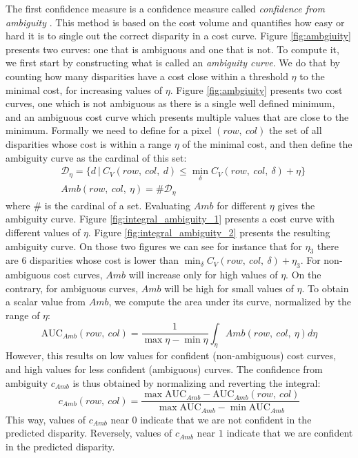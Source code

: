 The first confidence measure is a confidence measure called \textit{confidence from ambiguity} \cite{sarrazin_ambiguity_2021}. This method is based on the cost volume and quantifies how easy or hard it is to single out the correct disparity in a cost curve. Figure \ref{fig:ambgiuity} presents two curves: one that is ambiguous and one that is not. To compute it, we first start by constructing what is called an \textit{ambiguity curve}. We do that by counting how many disparities have a cost close within a threshold $\eta$ to the minimal cost, for increasing values of $\eta$. Figure \ref{fig:ambgiuity} presents two cost curves, one which is not ambiguous as there is a single well defined minimum, and an ambiguous cost curve which presents multiple values that are close to the minimum. Formally we need to define for a pixel $(row, ~col)$ the set of all disparities whose cost is within a range $\eta$ of the minimal cost, and then define the ambiguity curve as the cardinal of this set:
\begin{align}
    &\mathcal{D}_\eta = \{d ~|~ C_V(row,~col,~d) \leqslant \min_\delta C_V(row, ~col, ~\delta) + \eta\}\\
    &Amb(row, ~col, ~\eta) = \#\mathcal{D}_\eta
\end{align}
where $\#$ is the cardinal of a set. Evaluating $Amb$ for different $\eta$ gives the ambiguity curve. Figure \ref{fig:integral_ambiguity_1} presents a cost curve with different values of $\eta$. Figure \ref{fig:integral_ambiguity_2} presents the resulting ambiguity curve. On those two figures we can see for instance that for $\eta_3$ there are $6$ disparities whose cost is lower than $\min_\delta C_V(row, ~col, ~\delta) + \eta_3$. For non-ambiguous cost curves, $Amb$ will increase only for high values of $\eta$. On the contrary, for ambiguous curves, $Amb$ will be high for small values of $\eta$. To obtain a scalar value from $Amb$, we compute the area under its curve, normalized by the range of $\eta$:
\begin{equation}
    \mathrm{AUC}_{Amb}(row, ~col) = \frac{1}{\max\eta-\min\eta}\int_\eta Amb(row,~col,~\eta)d\eta
\end{equation}
However, this results on low values for confident (non-ambiguous) cost curves, and high values for less confident (ambiguous) curves. The confidence from ambiguity $c_{Amb}$ is thus obtained by normalizing and reverting the integral:
\begin{equation}\label{eq:confidence_from_ambiguity}
    c_{Amb}(row, ~col) = \frac{\max \mathrm{AUC}_{Amb}- \mathrm{AUC}_{Amb}(row, ~col)}{\max \mathrm{AUC}_{Amb} -\min \mathrm{AUC}_{Amb}}
\end{equation}
This way, values of $c_{Amb}$ near $0$ indicate that we are not confident in the predicted disparity. Reversely, values of $c_{Amb}$ near $1$ indicate that we are confident in the predicted disparity.

